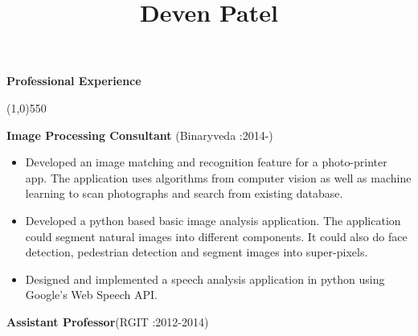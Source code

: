 \documentclass[a4paper,12pt]{article}
\begin{document}
\title{Deven Patel}
\date{}
\maketitle


\Large\textbf{Professional Experience}
\tiny
\begin{center}
\line(1,0){550}
\end{center}
\large
\textbf{Image Processing Consultant} \normalsize\hspace{5cm}(Binaryveda :2014-)

\begin{itemize}
\item Developed an image matching and recognition feature for a photo-printer app. The application uses algorithms from computer vision as well as machine learning to scan photographs and search from existing database. 
\item Developed a python based basic image analysis application. The application could segment natural  images into different components. It could also do face detection, pedestrian detection and segment images into super-pixels. 
\item Designed and implemented a speech analysis application in python using Google's Web Speech API. 
\end{itemize}

\bigskip

\large
\textbf{Assistant Professor}\normalsize\hspace{6cm}(RGIT :2012-2014)
\end{document}
